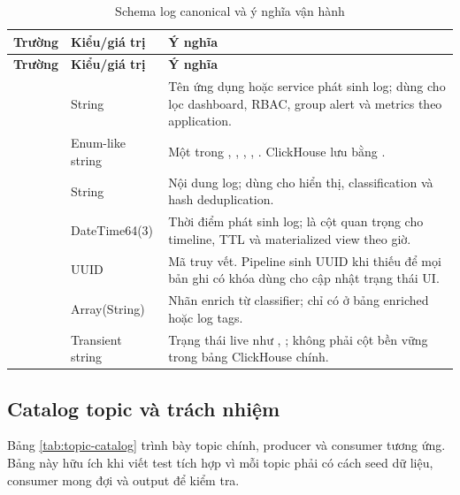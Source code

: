\begin{longtable}{|P{3.2cm}|P{3.3cm}|P{7.6cm}|}
\caption{Schema log canonical và ý nghĩa vận hành}
\label{tab:log-schema}\\
\hline
\textbf{Trường} & \textbf{Kiểu/giá trị} & \textbf{Ý nghĩa} \\ \hline
\endfirsthead
\hline
\textbf{Trường} & \textbf{Kiểu/giá trị} & \textbf{Ý nghĩa} \\ \hline
\endhead
{} & String & Tên ứng dụng hoặc service phát sinh log; dùng cho lọc dashboard, RBAC, group alert và metrics theo application. \\ \hline
{} & Enum-like string & Một trong , , , , . ClickHouse lưu bằng . \\ \hline
{} & String & Nội dung log; dùng cho hiển thị, classification và hash deduplication. \\ \hline
{} & DateTime64(3) & Thời điểm phát sinh log; là cột quan trọng cho timeline, TTL và materialized view theo giờ. \\ \hline
{} & UUID & Mã truy vết. Pipeline sinh UUID khi thiếu để mọi bản ghi có khóa dùng cho cập nhật trạng thái UI. \\ \hline
{} & Array(String) & Nhãn enrich từ classifier; chỉ có ở bảng enriched hoặc log tags. \\ \hline
{} & Transient string & Trạng thái live như , ; không phải cột bền vững trong bảng ClickHouse chính. \\ \hline
\end{longtable}

\subsection{Catalog topic và trách nhiệm}

Bảng \ref{tab:topic-catalog} trình bày topic chính, producer và consumer tương ứng. Bảng này hữu ích khi viết test tích hợp vì mỗi topic phải có cách seed dữ liệu, consumer mong đợi và output để kiểm tra.


